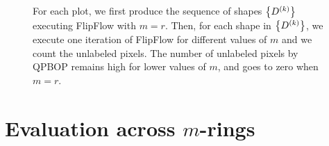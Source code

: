 \begin{figure}
\begin{minipage}[b]{0.5\textwidth}
\end{minipage}
\caption{For each plot, we first produce the sequence of shapes $\left\{ D^{(k)} \right\}$ executing FlipFlow with $m=r$. Then, for each shape in $\left\{ D^{(k)} \right\}$, we execute one iteration of FlipFlow for different values of $m$ and we count the unlabeled pixels. The number of unlabeled pixels by QPBOP remains high for lower values of $m$, and goes to zero when $m=r$. %
}
\label{ch6:fig:unlabeled-versus-iterations}
\end{figure}



\section{Evaluation across $m$-rings}
\label{ch6:sec:evaluation-across-rings}

